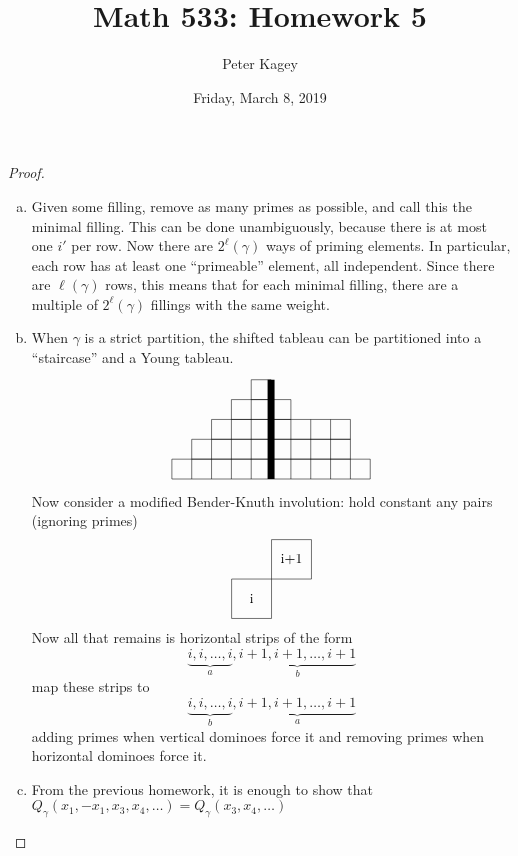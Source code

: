 \documentclass{article}
\newenvironment{problem}[2][Problem]{\begin{trivlist}
\item[\hskip \labelsep {\bfseries #1}\hskip \labelsep {\bfseries #2.}]}{\end{trivlist}}
\begin{document}
\title{Math 533: Homework 5}
\author{Peter Kagey}
\date{Friday, March 8, 2019}

\maketitle

\begin{problem}{1}
\end{problem}

\begin{proof} ~
  \begin{enumerate}[(a)]
    \item Given some filling, remove as many primes as possible, and call this
    the minimal filling. This can be
    done unambiguously, because there is at most one $i'$ per row.
    Now there are $2^\ell(\gamma)$ ways of priming elements. In particular, each
    row has at least one ``primeable'' element, all independent.
    Since there are $\ell(\gamma)$ rows, this means that for each minimal
    filling, there are a multiple of $2^\ell(\gamma)$ fillings with the same
    weight.
    \item When $\gamma$ is a strict partition, the shifted tableau can be
    partitioned into a ``staircase'' and a Young tableau. \[
      \begin{tikzpicture}[scale=0.5]
        \draw (0,0) grid (10,1);
        \draw (1,1) grid (9,2);
        \draw (2,2) grid (9,3);
        \draw (3,3) grid (6,4);
        \draw (4,4) grid (5,5);
        \draw[line width=5] (5,0)--(5,5);
      \end{tikzpicture}
    \]
    Now consider a modified Bender-Knuth involution: hold constant any pairs (ignoring primes) \[
    \begin{tikzpicture}[scale=0.5]
      \draw (0,0) rectangle (2,2);
      \draw (2,2) rectangle (4,4);
      \node at (1,1) {i};
      \node at (3,3) {i+1};
    \end{tikzpicture}
    \] Now all that remains is horizontal strips of the form \[
      \underbrace{i, i, \hdots, i}_a, \underbrace{i+1, i+1, \hdots, i+1}_b
    \] map these strips to \[
      \underbrace{i, i, \hdots, i}_b, \underbrace{i+1, i+1, \hdots, i+1}_a
    \] adding primes when vertical dominoes force it and removing primes when
    horizontal dominoes force it.
    \item From the previous homework, it is enough to show that
    $Q_\gamma(x_1,-x_1,x_3,x_4,\hdots) = Q_\gamma(x_3,x_4,\hdots)$
  \end{enumerate}
\end{proof}
\pagebreak
\begin{problem}{2}
\end{problem}
\end{document}
